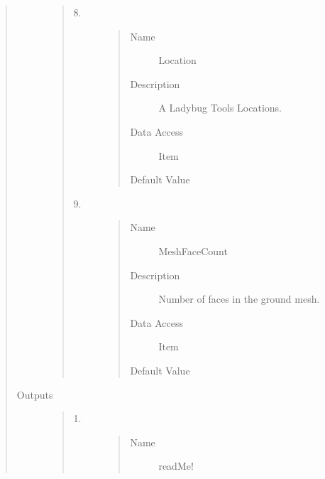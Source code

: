 \documentclass[letterpaper,10pt,english]{sphinxmanual}
\begin{document}
\begin{quote}
\begin{description}
\begin{quote}
\begin{description}
\begin{quote}
\begin{description}
\end{description}\end{quote}

\item[{8.}] \leavevmode\begin{quote}\begin{description}
\item[{Name}] \leavevmode
Location

\item[{Description}] \leavevmode
A Ladybug Tools Locations.

\item[{Data Access}] \leavevmode
Item

\item[{Default Value}] \leavevmode
{}

\end{description}\end{quote}

\item[{9.}] \leavevmode\begin{quote}\begin{description}
\item[{Name}] \leavevmode
MeshFaceCount

\item[{Description}] \leavevmode
Number of faces in the ground mesh.

\item[{Data Access}] \leavevmode
Item

\item[{Default Value}] \leavevmode
{}

\end{description}\end{quote}

\end{description}\end{quote}

\item[{Outputs}] \leavevmode\begin{quote}\begin{description}
\item[{1.}] \leavevmode\begin{quote}\begin{description}
\item[{Name}] \leavevmode
readMe!


\end{description}
\end{quote}
\end{description}
\end{quote}
\end{description}
\end{quote}
\end{document}
